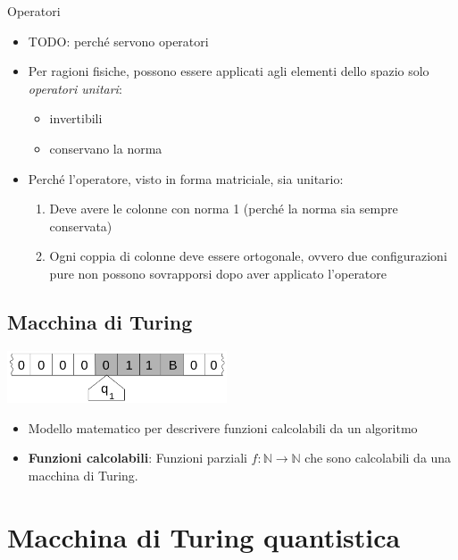 \documentclass{beamer}
\begin{document}
\begin{frame}{\subsecname}{Operatori}
	\begin{itemize}
		\item TODO: perché servono operatori
		\item Per ragioni fisiche, possono essere applicati agli elementi dello spazio solo \textit{operatori unitari}:
		\begin{itemize}
			\item invertibili
			\item conservano la norma
		\end{itemize}
		\item Perché l'operatore, visto in forma matriciale, sia unitario:
		\begin{enumerate}
			\item Deve avere le colonne con norma 1 (perché la norma sia sempre conservata)
			\item Ogni coppia di colonne deve essere ortogonale, ovvero due configurazioni pure non possono sovrapporsi dopo aver applicato l'operatore
		\end{enumerate}
	\end{itemize}
\end{frame}

\subsection{Macchina di Turing}

\begin{frame}{\subsecname}{}
	\centering\includegraphics[width=6.5cm]{Turing_machine_2b.svg.png}
	\begin{itemize}
		\item Modello matematico per descrivere funzioni calcolabili da un algoritmo
		\item \textbf{Funzioni calcolabili}: Funzioni parziali \( f : \mathbb{N} \rightarrow \mathbb{N} \) che sono calcolabili da una macchina di Turing.
	\end{itemize}
\end{frame}

\section{Macchina di Turing quantistica}
\end{document}
